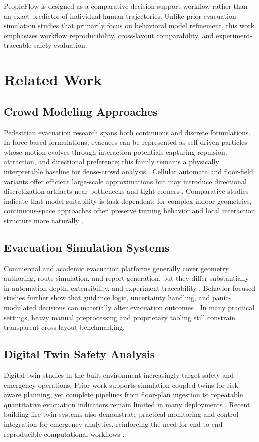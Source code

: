 \documentclass[journal]{IEEEtran}
\begin{document}
PeopleFlow is designed as a comparative decision-support workflow rather than an exact predictor of individual human trajectories.
Unlike prior evacuation simulation studies that primarily focus on behavioral model refinement, this work emphasizes workflow reproducibility, cross-layout comparability, and experiment-traceable safety evaluation.

\section{Related Work}
\subsection{Crowd Modeling Approaches}
Pedestrian evacuation research spans both continuous and discrete formulations. In force-based formulations, evacuees can be represented as self-driven particles whose motion evolves through interaction potentials capturing repulsion, attraction, and directional preference; this family remains a physically interpretable baseline for dense-crowd analysis \cite{sfm,helbing2000}. Cellular automata and floor-field variants offer efficient large-scale approximations but may introduce directional discretization artifacts near bottlenecks and tight corners \cite{ca,kirchner2002}. Comparative studies indicate that model suitability is task-dependent; for complex indoor geometries, continuous-space approaches often preserve turning behavior and local interaction structure more naturally \cite{zheng2009,duives2013,crowd_book}.

\subsection{Evacuation Simulation Systems}
Commercial and academic evacuation platforms generally cover geometry authoring, route simulation, and report generation, but they differ substantially in automation depth, extensibility, and experiment traceability \cite{path_planning,ronchi2015,lovreglio2020}. Behavior-focused studies further show that guidance logic, uncertainty handling, and panic-modulated decisions can materially alter evacuation outcomes \cite{pan2007,chen2018}. In many practical settings, heavy manual preprocessing and proprietary tooling still constrain transparent cross-layout benchmarking.

\subsection{Digital Twin Safety Analysis}
Digital twin studies in the built environment increasingly target safety and emergency operations. Prior work supports simulation-coupled twins for risk-aware planning, yet complete pipelines from floor-plan ingestion to repeatable quantitative evacuation indicators remain limited in many deployments \cite{sharma2020,chu2022,batty2012,zhang2021dtwins}. Recent building-fire twin systems also demonstrate practical monitoring and control integration for emergency analytics, reinforcing the need for end-to-end reproducible computational workflows \cite{ding2023jbe,jiang2023autcon}.
\end{document}
